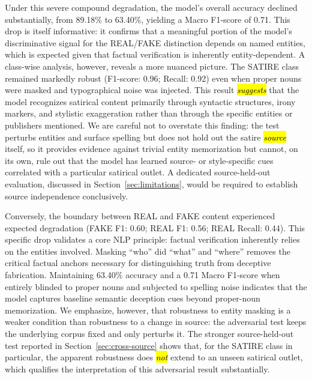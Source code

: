 \documentclass[informatics,article,accept,pdftex,moreauthors]{Definitions/mdpi}
\begin{document}
Under this severe compound degradation, the model's overall accuracy declined substantially, from 89.18\% to 63.40\%, yielding a Macro F1-score of 0.71. This drop is itself informative: it confirms that a meaningful portion of the model's discriminative signal for the REAL/FAKE distinction depends on named entities, which is expected given that factual verification is inherently entity-dependent. A class-wise analysis, however, reveals a more nuanced picture. The SATIRE class remained markedly robust (F1-score: 0.96; Recall: 0.92) even when proper nouns were masked and typographical noise was injected. This result \emph{\hl{suggests}} that the model recognizes satirical content primarily through syntactic structures, irony markers, and stylistic exaggeration rather than through the specific entities or publishers mentioned. We are careful not to overstate this finding: the test perturbs entities and surface spelling but does not hold out the satire \emph{\hl{source}} itself, so it provides evidence against trivial entity memorization but cannot, on its own, rule out that the model has learned source- or style-specific cues correlated with a particular satirical outlet. A dedicated source-held-out evaluation, discussed in Section~\ref{sec:limitations}, would be required to establish source independence conclusively.

Conversely, the boundary between REAL and FAKE content experienced expected degradation (FAKE F1: 0.60; REAL F1: 0.56; REAL Recall: 0.44). This specific drop validates a core NLP principle: factual verification inherently relies on the entities involved. Masking ``who'' did ``what'' and ``where'' removes the critical factual anchors necessary for distinguishing truth from deceptive fabrication. Maintaining 63.40\% accuracy and a 0.71 Macro F1-score when entirely blinded to proper nouns and subjected to spelling noise indicates that the model captures baseline semantic deception cues beyond proper-noun memorization. We emphasize, however, that robustness to entity masking is a weaker condition than robustness to a change in source: the adversarial test keeps the underlying corpus fixed and only perturbs it. The stronger source-held-out test reported in Section~\ref{sec:cross-source} shows that, for the SATIRE class in particular, the apparent robustness does \emph{\hl{not}} extend to an unseen satirical outlet, which qualifies the interpretation of this adversarial result substantially.
\end{document}
